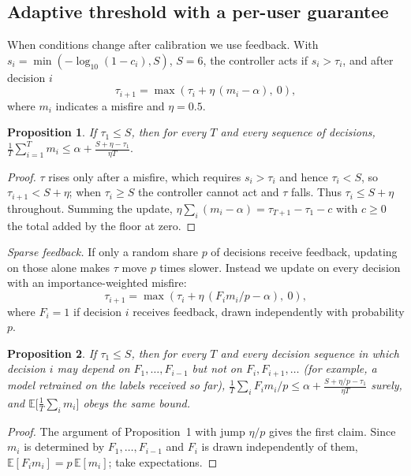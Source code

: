 \documentclass[conference]{IEEEtran}
\newtheorem{proposition}{Proposition}
\newcommand{\target}{\alpha}
\begin{document}
\subsection{Adaptive threshold with a per-user guarantee}
When conditions change after calibration we use feedback. With $s_i=\min(-\log_{10}(1-c_i),S)$, $S=6$, the controller acts if $s_i>\tau_i$, and after decision $i$
\begin{equation}
\tau_{i+1} = \max\left(\tau_i + \eta\,(m_i - \target),\ 0\right),
\end{equation}
where $m_i$ indicates a misfire and $\eta=0.5$.

\begin{proposition}
If $\tau_1 \le S$, then for every $T$ and every sequence of decisions,
$\frac{1}{T}\sum_{i=1}^{T} m_i \le \target + \frac{S+\eta-\tau_1}{\eta T}.$
\end{proposition}
\begin{proof}
$\tau$ rises only after a misfire, which requires $s_i>\tau_i$ and hence $\tau_i<S$, so $\tau_{i+1}<S+\eta$; when $\tau_i\ge S$ the controller cannot act and $\tau$ falls. Thus $\tau_i\le S+\eta$ throughout. Summing the update, $\eta\sum_i(m_i-\target)=\tau_{T+1}-\tau_1-c$ with $c\ge0$ the total added by the floor at zero.
\end{proof}

\emph{Sparse feedback.} If only a random share $p$ of decisions receive feedback, updating on those alone makes $\tau$ move $p$ times slower. Instead we update on every decision with an importance-weighted misfire:
\begin{equation}
\tau_{i+1} = \max\left(\tau_i + \eta\,(F_i m_i/p - \target),\ 0\right),
\end{equation}
where $F_i=1$ if decision $i$ receives feedback, drawn independently with probability $p$.

\begin{proposition}
If $\tau_1\le S$, then for every $T$ and every decision sequence in which decision $i$ may depend on $F_1,\dots,F_{i-1}$ but not on $F_i,F_{i+1},\dots$ (for example, a model retrained on the labels received so far), $\frac{1}{T}\sum_i F_i m_i/p \le \target + \frac{S+\eta/p-\tau_1}{\eta T}$ surely, and $\mathbb{E}\big[\frac{1}{T}\sum_i m_i\big]$ obeys the same bound.
\end{proposition}
\begin{proof}
The argument of Proposition~1 with jump $\eta/p$ gives the first claim. Since $m_i$ is determined by $F_1,\dots,F_{i-1}$ and $F_i$ is drawn independently of them, $\mathbb{E}[F_i m_i]=p\,\mathbb{E}[m_i]$; take expectations.
\end{proof}
\end{document}
